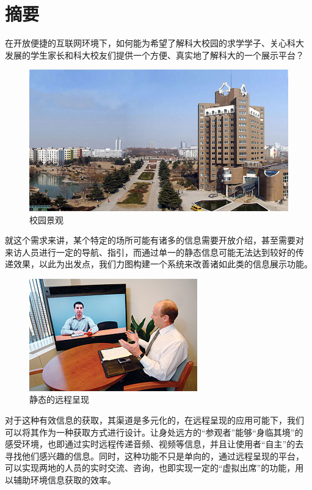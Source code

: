 \chapter[前言]{摘要} 
\label{cha:front}

在开放便捷的互联网环境下，如何能为希望了解科大校园的求学学子、关心科大
发展的学生家长和科大校友们提供一个方便、真实地了解科大的一个展示平台？ 

\begin{figure}[h]
        \centering
                \includegraphics[width=.70\textwidth]{Figures/ch1.school.jpg}
        \caption{校园景观}
        \label{fig:executive}
\end{figure}

就这个需求来讲，某个特定的场所可能有诸多的信息需要开放介绍，甚至需要对
来访人员进行一定的导航、指引，而通过单一的静态信息可能无法达到较好的传
递效果，以此为出发点，我们力图构建一个系统来改善诸如此类的信息展示功能。

\begin{figure}[h]
        \centering
                \includegraphics[width=.50\textwidth]{Figures/ch1.tele.jpg}
        \caption{静态的远程呈现}
        \label{fig:execimage2}
\end{figure}

对于这种有效信息的获取，其渠道是多元化的，在远程呈现的应用可能下，我们
可以将其作为一种获取方式进行设计。让身处远方的“参观者”能够“身临其境”的
感受环境，也即通过实时远程传递音频、视频等信息，并且让使用者“自主”的去
寻找他们感兴趣的信息。同时，这种功能不只是单向的，通过远程呈现的平台，
可以实现两地的人员的实时交流、咨询，也即实现一定的“虚拟出席”的功能，用
以辅助环境信息获取的效率。

